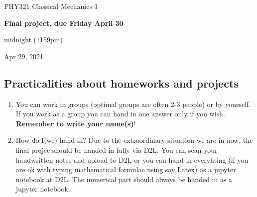 \documentclass[%
oneside,                 %
final,                   %
10pt]{article}
\begin{document}

\newcommand{\exercisesection}[1]{\subsection*{#1}}






\thispagestyle{empty}

\begin{center}
{\LARGE\bf
\begin{spacing}{1.25}
PHY321 Classical Mechanics 1
\end{spacing}
}
\end{center}


\begin{center}
{\bf Final  project, due Friday April 30}
\end{center}

    \begin{center}
\centerline{{\small midnight (1159pm)}}
\end{center}
    

\begin{center}
Apr 29, 2021
\end{center}

\vspace{1cm}


\subsection*{Practicalities about  homeworks and projects}

\begin{enumerate}
\item You can work in groups (optimal groups are often 2-3 people) or by yourself. If you work as a group you can hand in one answer only if you wish. \textbf{Remember to write your name(s)}!

\item How do I(we)  hand in?  Due to the extraordinary situation we are in now, the final projec should be handed in fully via D2L. You can scan your handwritten notes and upload to D2L or you can hand in everyhting (if you are ok with typing mathematical formulae using say Latex) as a jupyter notebook at D2L. The numerical part should always be handed in as a jupyter notebook.
\end{enumerate}
\end{document}
